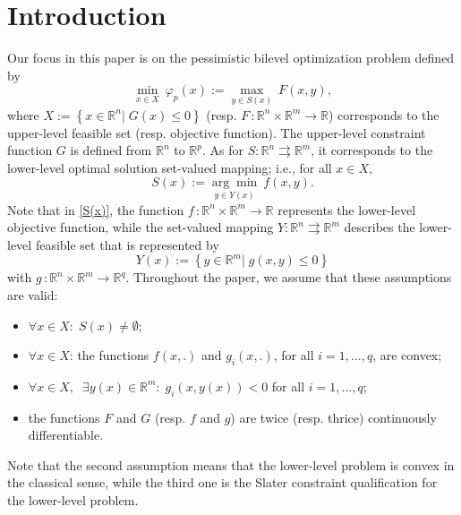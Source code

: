 \section{Introduction}\label{Introduction}
Our focus in this paper is on the pessimistic bilevel optimization problem defined by 
\begin{equation}\tag{P$_p$}\label{PBP}
    \underset{x\in X}\min~\varphi_{p}(x):=\underset{y\in S(x)}\max~F(x,y),
\end{equation}
where $X:=\left\{x\in \mathbb{R}^n\left|\; G(x)\leq 0\right.\right\}$ (resp. $F\, : \mathbb{R}^n\times \mathbb{R}^m \rightarrow \mathbb{R}$) corresponds to the upper-level feasible set (resp. objective function). The upper-level constraint function $G$ is defined from $\mathbb{R}^n$ to $\mathbb{R}^p$. As for  $S: \mathbb{R}^n \rightrightarrows \mathbb{R}^m$, it corresponds to the lower-level optimal solution set-valued mapping; i.e., for all $x\in X$, 
 \begin{equation}\label{S(x)}
    S(x):=\underset{y\in Y(x)}{\arg\min}~f(x,y). 
 \end{equation}
 Note that in \eqref{S(x)}, the function $f\, : \mathbb{R}^n\times \mathbb{R}^m \rightarrow \mathbb{R}$ represents the lower-level objective function, while the set-valued mapping $Y: \mathbb{R}^n \rightrightarrows \mathbb{R}^m$ describes the lower-level feasible set that is represented by 
 \begin{equation}\label{Y(x)}
    Y(x):=\left\{y\in \mathbb{R}^m|\; g(x,y)\leq 0\right\}
 \end{equation}
with $g\, : \mathbb{R}^n\times \mathbb{R}^m \rightarrow \mathbb{R}^q$. Throughout the paper, we assume that these assumptions are valid:
\begin{itemize}
    \item $\forall x\in X:\; S(x) \neq \emptyset$;
    \item $\forall x\in X$:\; the functions $f(x, .)$ and $g_i(x, .)$, for all $i=1, \ldots, q$, are convex;
    \item $\forall x\in X,\;\; \exists y(x)\in\mathbb{R}^{m}: \;g_{i}(x,y(x))<0$ for all $i=1, \ldots, q$;
    \item the functions $F$ and $G$ (resp. $f$ and $g$) are twice (resp. thrice) continuously differentiable.
\end{itemize}
Note that the second assumption means that the lower-level problem is convex in the classical sense, while the third one is the Slater constraint qualification for the lower-level problem. 

